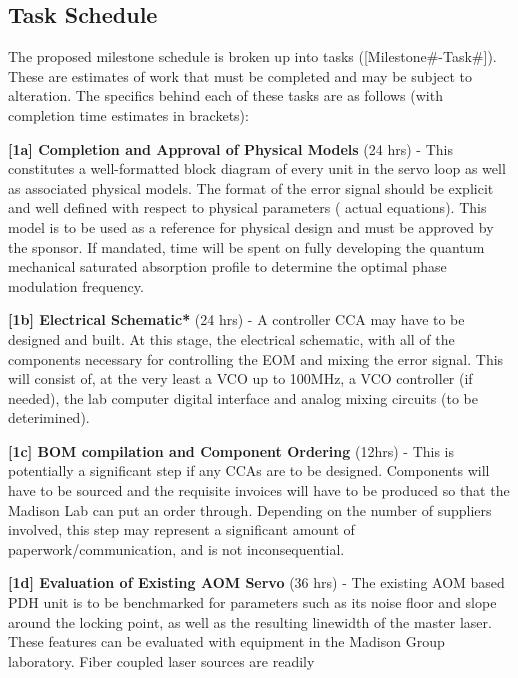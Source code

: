 \subsection{Task Schedule}  %

The proposed milestone schedule is broken up into tasks ([Milestone\#-Task\#]).
These are estimates of work that must be completed and may be subject to
alteration. The specifics behind each of these tasks are as follows (with
completion time estimates in brackets):

\begin{packed_itemize}
  \item{\textbf{[1a] Completion and Approval of Physical Models} (24 hrs)}
  - This constitutes a well-formatted block diagram of every unit in the servo
  loop as well as associated physical models. The format of the error signal
  should be explicit and well defined with respect to physical parameters (
  actual equations). This model is to be used as a reference for physical
  design and must be approved by the sponsor. If mandated, time will be spent on
  fully developing the quantum mechanical saturated absorption profile to
  determine the optimal phase modulation frequency.
  \item{\textbf{[1b] Electrical Schematic*} (24 hrs)}
  - A controller CCA may have to be designed and built. At this stage,
  the electrical schematic, with all of the components necessary for controlling
  the EOM and mixing the error signal. This will consist of, at the very least
  a VCO up to 100MHz, a VCO controller (if needed), the lab computer digital
  interface and analog mixing circuits (to be deterimined).
  \item{\textbf{[1c] BOM compilation and Component Ordering} (12hrs)}
  - This is potentially a significant step if any CCAs are to be designed.
  Components will have to be sourced and the requisite invoices will have to be
  produced so that the Madison Lab can put an order through. Depending on the
  number of suppliers involved, this step may represent a significant amount of
  paperwork/communication, and is not inconsequential.
  \item{\textbf{[1d] Evaluation of Existing AOM Servo} (36 hrs)}
  - The existing AOM based PDH unit is to be benchmarked for parameters such as
  its noise floor and slope around the locking point, as well as the resulting
  linewidth of the master laser. These features can be evaluated with equipment
  in the Madison Group laboratory. Fiber coupled laser sources are readily

\end{packed_itemize}
